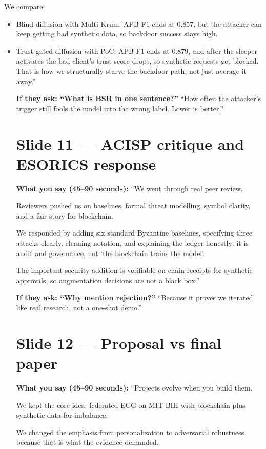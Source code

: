 \documentclass[11pt,a4paper]{article}
\begin{document}
We compare:
\begin{itemize}
\item Blind diffusion with Multi-Krum: APB-F1 ends at 0.857, but the attacker can keep getting bad synthetic data, so backdoor success stays high.
\item Trust-gated diffusion with PoC: APB-F1 ends at 0.879, and after the sleeper activates the bad client's trust score drops, so synthetic requests get blocked. That is how we structurally starve the backdoor path, not just average it away.''

\textbf{If they ask: ``What is BSR in one sentence?''}
``How often the attacker's trigger still fools the model into the wrong label. Lower is better.''

\section{Slide 11 --- ACISP critique and ESORICS response}

\textbf{What you say (45--90 seconds):}
``We went through real peer review.

Reviewers pushed us on baselines, formal threat modelling, symbol clarity, and a fair story for blockchain.

We responded by adding six standard Byzantine baselines, specifying three attacks clearly, cleaning notation, and explaining the ledger honestly: it is audit and governance, not `the blockchain trains the model'.

The important security addition is verifiable on-chain receipts for synthetic approvals, so augmentation decisions are not a black box.''

\textbf{If they ask: ``Why mention rejection?''}
``Because it proves we iterated like real research, not a one-shot demo.''

\section{Slide 12 --- Proposal vs final paper}

\textbf{What you say (45--90 seconds):}
``Projects evolve when you build them.

We kept the core idea: federated ECG on MIT-BIH with blockchain plus synthetic data for imbalance.

We changed the emphasis from personalization to adversarial robustness because that is what the evidence demanded.


\end{itemize}
\end{document}
